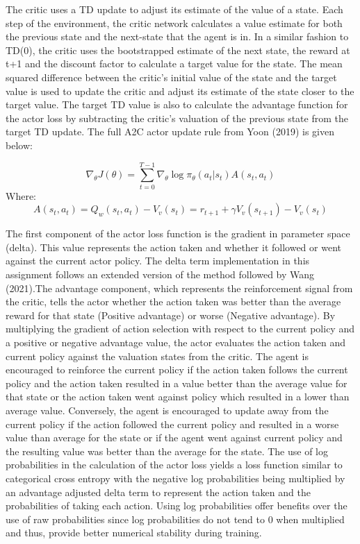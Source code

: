 \documentclass{article}
\begin{document}
The critic uses a TD update to adjust its estimate of the value of a state. Each step of the environment, the critic network calculates a value estimate for both the previous state and the next-state that the agent is in. In a similar fashion to TD(0), the critic uses the bootstrapped estimate of the next state, the reward at t+1 and the discount factor to calculate a target value for the state. The mean squared difference between the critic's initial value of the state and the target value is used to update the critic and adjust its estimate of the state closer to the target value. The target TD value is also to calculate the advantage function for the actor loss by subtracting the critic's valuation of the previous state from the target TD update. The full A2C actor update rule from Yoon (2019) is given below:

\begin{equation}
\nabla_{\theta} J(\theta) = \sum_{t=0}^{T-1}\nabla_{\theta}\log{\pi_{\theta}}(a_{t} | s_{t}) A(s_{t}, a_{t})
\end{equation}
Where:
\begin{equation}
A(s_{t}, a_{t}) = Q_{w}(s_{t}, a_{t}) - V_{v}(s_{t}) = r_{t+1} + \gamma V_{v}(s_{t+1}) - V_{v}(s_{t})
\end{equation}

The first component of the actor loss function is the gradient in parameter space (delta). This value represents the action taken and whether it followed or went against the current actor policy. The delta term implementation in this assignment follows an extended version of the method followed by Wang (2021).The advantage component, which represents the reinforcement signal from the critic, tells the actor whether the action taken was better than the average reward for that state (Positive advantage) or worse (Negative advantage). By multiplying the gradient of action selection with respect to the current policy and a positive or negative advantage value, the actor evaluates the action taken and current policy against the valuation states from the critic. The agent is encouraged to reinforce the current policy if the action taken follows the current policy and the action taken resulted in a value better than the average value for that state or the action taken went against policy which resulted in a lower than average value. Conversely, the agent is encouraged to update away from the current policy if the action followed the current policy and resulted in a worse value than average for the state or if the agent went against current policy and the resulting value was better than the average for the state. The use of log probabilities in the calculation of the actor loss yields a loss function similar to categorical cross entropy with the negative log probabilities being multiplied by an advantage adjusted delta term to represent the action taken and the probabilities of taking each action. Using log probabilities offer benefits over the use of raw probabilities since log probabilities do not tend to 0 when multiplied and thus, provide better numerical stability during training.
\end{document}
